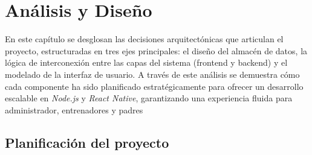 \chapter{Análisis y Diseño}

En este capítulo se desglosan las decisiones arquitectónicas que articulan el proyecto, estructuradas en tres ejes principales: el diseño del almacén de datos, la lógica de interconexión entre las capas del sistema (frontend y backend) y el modelado de la interfaz de usuario. A través de este análisis se demuestra cómo cada componente ha sido planificado estratégicamente para ofrecer un desarrollo escalable en \textit{Node.js} y \textit{React Native}, garantizando una experiencia fluida para administrador, entrenadores y padres

\section{Planificación del proyecto}
